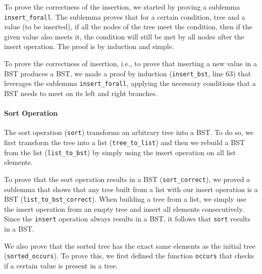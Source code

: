 \documentclass[a4paper]{article}
\begin{document}


To prove the correctness of the insertion, we started by proving a sublemma \texttt{insert\_forall}. The sublemma proves that for a certain condition, tree and a value (to be inserted), if all the nodes of the tree meet the condition, then if the given value also meets it, the condition will still be met by all nodes after the insert operation. The proof is by induction and simple.



To prove the correctness of insertion, i.e., to prove that inserting a new value in a BST produces a BST, we made a proof by induction (\texttt{insert\_bst}, line 63) that leverages the sublemma \texttt{insert\_forall}, applying the necessary conditions that a BST needs to meet on its left and right branches.



\paragraph{Sort Operation}

The sort operation (\texttt{sort}) transforms an arbitrary tree into a BST. To do so, we first transform the tree into a list (\texttt{tree\_to\_list}) and then we rebuild a BST from the list (\texttt{list\_to\_bst}) by simply using the insert operation on all list elements.



To prove that the sort operation results in a BST (\texttt{sort\_correct}), we proved a sublemma that shows that any tree built from a list with our insert operation is a BST (\texttt{list\_to\_bst\_correct}). When building a tree from a list, we simply use the insert operation from an empty tree and insert all elements consecutively. Since the \texttt{insert} operation always results in a BST, it follows that \texttt{sort} results in a BST.



We also prove that the sorted tree has the exact same elements as the initial tree (\texttt{sorted\_occurs}). To prove this, we first defined the function \texttt{occurs} that checks if a certain value is present in a tree.
\end{document}
